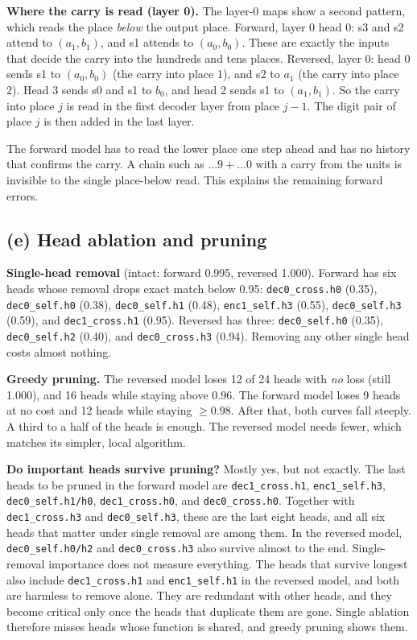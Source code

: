 \documentclass[11pt]{article}
\begin{document}
\textbf{Where the carry is read (layer 0).} The layer-0 maps show a second
pattern, which reads the place \emph{below} the output place. Forward, layer 0 head 0:
s3 and s2 attend to $(a_1,b_1)$, and s1 attends to $(a_0,b_0)$. These are exactly
the inputs that decide the carry into the hundreds and tens places. Reversed, layer 0:
head 0 sends s1 to $(a_0,b_0)$ (the carry into place 1), and s2 to $a_1$
(the carry into place 2). Head 3 sends s0 and s1 to $b_0$, and head 2 sends s1 to $(a_1,b_1)$.
So the carry into place $j$ is read in the first decoder layer from place $j-1$.
The digit pair of place $j$ is then added in the last layer.

The forward model has to read the lower place one step ahead and has no
history that confirms the carry. A chain such as $\ldots 9 + \ldots 0$ with a
carry from the units is invisible to the single place-below read. This explains the
remaining forward errors.

\subsection*{(e) Head ablation and pruning}

\textbf{Single-head removal} (intact: forward 0.995, reversed 1.000). Forward
has six heads whose removal drops exact match below 0.95: \texttt{dec0\_cross.h0} (0.35),
\texttt{dec0\_self.h0} (0.38), \texttt{dec0\_self.h1} (0.48), \texttt{enc1\_self.h3} (0.55),
\texttt{dec0\_self.h3} (0.59), and \texttt{dec1\_cross.h1} (0.95). Reversed has three: \texttt{dec0\_self.h0}
(0.35), \texttt{dec0\_self.h2} (0.40), and \texttt{dec0\_cross.h3} (0.94). Removing any other single head
costs almost nothing.

\textbf{Greedy pruning.} The reversed model loses 12 of 24 heads with
\emph{no} loss (still 1.000), and 16 heads while staying above 0.96. The forward model
loses 9 heads at no cost and 12 heads while staying $\ge 0.98$. After that, both curves
fall steeply. A third to a half of the heads is enough. The reversed model needs fewer,
which matches its simpler, local algorithm.

\textbf{Do important heads survive pruning?} Mostly yes, but not exactly.
The last heads to be pruned in the forward model are
\texttt{dec1\_cross.h1}, \texttt{enc1\_self.h3}, \texttt{dec0\_self.h1/h0}, \texttt{dec1\_cross.h0},
and \texttt{dec0\_cross.h0}. Together with \texttt{dec1\_cross.h3} and \texttt{dec0\_self.h3}, these are the last eight heads,
and all six heads that matter under single removal are among them. In the reversed model, \texttt{dec0\_self.h0/h2} and \texttt{dec0\_cross.h3} also survive
almost to the end. Single-removal importance does not measure everything. The heads that survive
longest also include \texttt{dec1\_cross.h1} and \texttt{enc1\_self.h1} in the reversed model,
and both are harmless to remove alone. They are redundant with other heads, and they become
critical only once the heads that duplicate them are gone. Single ablation therefore misses heads
whose function is shared, and greedy pruning shows them.
\end{document}
